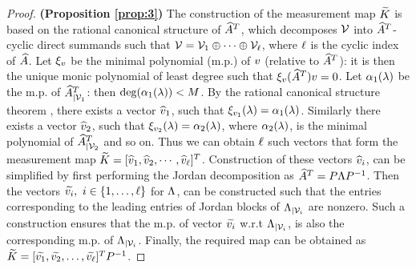\begin{proof}
\textbf{(Proposition \ref{prop:3})}
The construction of the measurement map $\widetilde{K}$ is based on the rational canonical structure of $\widehat{A}^T$, which decomposes $ \mathcal{V} $ into $\widehat{A}^T$-cyclic direct summands such that $\mathcal{V} = \mathcal{V}_1 \oplus \cdots \oplus \mathcal{V}_\ell$, where $\ell$ is the cyclic index of $\widehat{A}$. Let $\xi_{v}$ be the minimal polynomial (m.p.) of $ v $ (relative to $\widehat{A}^T$): it is then the unique monic polynomial of least degree such that $\xi_{v}(\widehat{A}^T)v=0$. Let $\alpha_1(\lambda)$ be the m.p. of ${\widehat{A}^T}_{|\mathcal{V}_1}$: then $\operatorname{deg}(\alpha_1(\lambda)) < M$. By the rational canonical structure theorem \cite{wonham1974linear}, there exists a vector $\widehat{v}_1$, such that $\xi_{v_1}(\lambda)=\alpha_1(\lambda)$. Similarly there exists a vector $\widehat{v}_2$, such that $\xi_{v_2}(\lambda)=\alpha_2(\lambda)$, where $\alpha_2(\lambda)$, is the minimal polynomial of ${\widehat{A}^T}_{|\mathcal{V}_2}$ and so on. Thus we can obtain $\ell$ such vectors that form the measurement map $\widetilde{K} = [\widehat{v}_1, \widehat{v}_2,\cdots, \widehat{v}_\ell]^T$. Construction of these vectors $\widehat{v}_i$, can be simplified by first performing the Jordan decomposition as $ \widehat{A}^T = P\Lambda P^{-1} $. Then the vectors $ \widetilde{v_i},\ i\in \{1,\dots,\ell\}$ for $ \Lambda $, can be constructed such that the entries corresponding to the leading entries of Jordan blocks of $ \Lambda_{|\mathcal{V}_i} $ are nonzero. Such a construction ensures that the m.p. of vector $ \widetilde{v_i}$ w.r.t $\Lambda_{|\mathcal{V}_i}$, is also the corresponding m.p. of 
$\Lambda_{|\mathcal{V}_i}$. Finally, the required map can be obtained as $ \widetilde{K} = [\widetilde{v_1}, \widetilde{v_2},\dots,\widetilde{v_\ell}]^TP^{-1}$.
\end{proof}
%                                                                                                                                                                                    
% 
